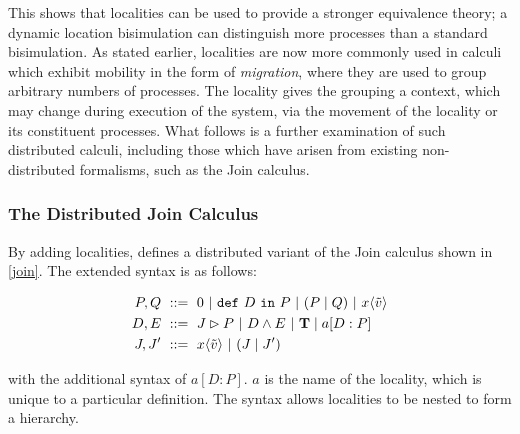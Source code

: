 This shows that localities can be used to provide a stronger equivalence
theory; a dynamic location bisimulation can distinguish more processes
than a standard bisimulation.  As stated earlier, localities are now
more commonly used in calculi which exhibit mobility in the form of
\emph{migration}, where they are used to group arbitrary numbers of
processes.  The locality gives the grouping a context, which may change
during execution of the system, via the movement of the locality or its
constituent processes.  What follows is a further examination of such
distributed calculi, including those which have arisen from existing
non-distributed formalisms, such as the Join calculus.



\subsubsection{The Distributed Join Calculus}

By adding localities, \cite{djoin} defines a distributed variant of the
Join calculus shown in \ref{join}.  The extended syntax is as follows:

\begin{align}
\label{djoinsyntax}
  P, Q\ & ::=\ 
  0\ |\ 
  \mathtt{def}\ D\ \mathtt{in}\ P\ |\
  (P\;|\;Q)\ |\ 
  x\langle \tilde{v} \rangle \\
  D, E\ & ::=\
  J \rhd P\ |\
  D \wedge E\ |\ 
  \mathbf{T} \pc 
 a[D : P]
 \\
  J,J^\prime\ & ::=\ 
  x\langle \tilde{v} \rangle\ |\
  (J\;|\;J^\prime)
\end{align}

\noindent with the additional syntax of $a[D : P]$.  $a$ is the name of
the locality, which is unique to a particular definition.  The syntax
allows localities to be nested to form a hierarchy.



